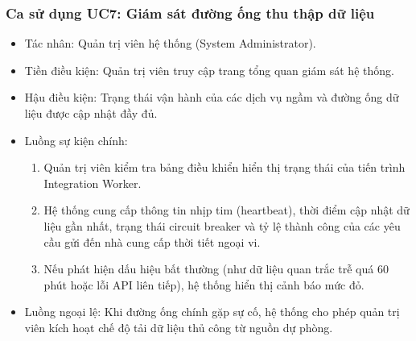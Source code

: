 \subsubsection{Ca sử dụng UC7: Giám sát đường ống thu thập dữ liệu}
\begin{itemize}
    \item Tác nhân: Quản trị viên hệ thống (System Administrator).
    \item Tiền điều kiện: Quản trị viên truy cập trang tổng quan giám sát hệ thống.
    \item Hậu điều kiện: Trạng thái vận hành của các dịch vụ ngầm và đường ống dữ liệu được cập nhật đầy đủ.
    \item Luồng sự kiện chính:
    \begin{enumerate}
        \item Quản trị viên kiểm tra bảng điều khiển hiển thị trạng thái của tiến trình Integration Worker.
        \item Hệ thống cung cấp thông tin nhịp tim (heartbeat), thời điểm cập nhật dữ liệu gần nhất, trạng thái circuit breaker và tỷ lệ thành công của các yêu cầu gửi đến nhà cung cấp thời tiết ngoại vi.
        \item Nếu phát hiện dấu hiệu bất thường (như dữ liệu quan trắc trễ quá 60 phút hoặc lỗi API liên tiếp), hệ thống hiển thị cảnh báo mức đỏ.
    \end{enumerate}
    \item Luồng ngoại lệ: Khi đường ống chính gặp sự cố, hệ thống cho phép quản trị viên kích hoạt chế độ tải dữ liệu thủ công từ nguồn dự phòng.
\end{itemize}

